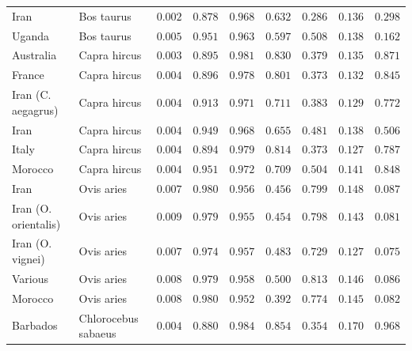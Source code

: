 \documentclass[12pt]{article}
\begin{document}
\begin{center}
\begin{adjustbox}{width=\textwidth}
\begin{tabular}{||l|l|r||r|r||r|r||r|r||}
                Iran               & Bos taurus        & $ 0.002$ & $ 0.878$ & $ 0.968$ & $ 0.632$ & $ 0.286$ & $ 0.136$ & $ 0.298$ \\
                Uganda              & Bos taurus        & $ 0.005$ & $ 0.951$ & $ 0.963$ & $ 0.597$ & $ 0.508$ & $ 0.138$ & $ 0.162$ \\
                \rowcolor{LIGHTGREY} Australia            & Capra hircus        & $ 0.003$ & $ 0.895$ & $ 0.981$ & $ 0.830$ & $ 0.379$ & $ 0.135$ & $ 0.871$ \\
                \rowcolor{LIGHTGREY} France                                    & Capra hircus          & $ 0.004$ & $ 0.896$ & $ 0.978$ & $ 0.801$ & $ 0.373$ & $ 0.132$ & $ 0.845$ \\
                \rowcolor{LIGHTGREY} Iran (C. aegagrus)                    & Capra hircus          & $ 0.004$ & $ 0.913$ & $ 0.971$ & $ 0.711$ & $ 0.383$ & $ 0.129$ & $ 0.772$ \\
                \rowcolor{LIGHTGREY} Iran                        & Capra hircus          & $ 0.004$ & $ 0.949$ & $ 0.968$ & $ 0.655$ & $ 0.481$ & $ 0.138$ & $ 0.506$ \\
                \rowcolor{LIGHTGREY} Italy                                 & Capra hircus          & $ 0.004$ & $ 0.894$ & $ 0.979$ & $ 0.814$ & $ 0.373$ & $ 0.127$ & $ 0.787$ \\
                \rowcolor{LIGHTGREY} Morocco                                 & Capra hircus          & $ 0.004$ & $ 0.951$ & $ 0.972$ & $ 0.709$ & $ 0.504$ & $ 0.141$ & $ 0.848$ \\
                Iran           & Ovis aries & $ 0.007$ & $ 0.980$ & $ 0.956$ & $ 0.456$ & $ 0.799$ & $ 0.148$ & $ 0.087$ \\
                Iran (O. orientalis)  & Ovis aries & $ 0.009$ & $ 0.979$ & $ 0.955$ & $ 0.454$ & $ 0.798$ & $ 0.143$ & $ 0.081$ \\
                Iran (O. vignei)           & Ovis aries & $ 0.007$ & $ 0.974$ & $ 0.957$ & $ 0.483$ & $ 0.729$ & $ 0.127$ & $ 0.075$ \\
                Various             & Ovis aries & $ 0.008$ & $ 0.979$ & $ 0.958$ & $ 0.500$ & $ 0.813$ & $ 0.146$ & $ 0.086$ \\
                Morocco              & Ovis aries & $ 0.008$ & $ 0.980$ & $ 0.952$ & $ 0.392$ & $ 0.774$ & $ 0.145$ & $ 0.082$ \\
                \rowcolor{LIGHTGREY} Barbados              & Chlorocebus sabaeus & $ 0.004$ & $ 0.880$ & $ 0.984$ & $ 0.854$ & $ 0.354$ & $ 0.170$ & $ 0.968$ \\

\end{tabular}
\end{adjustbox}
\end{center}
\end{document}
